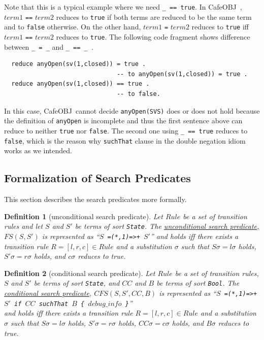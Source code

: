 \documentclass[12pt]{report}
\newtheorem{definition}{Definition}
\newcommand{\stt}[1]{{\small{\tt {#1}}}}
\newcommand{\ul}{\underline}
\newcommand{\cafeobj}{{\sf CafeOBJ}~}
\begin{document}
Note that this is a typical example where we need \stt{\_ == true}. In
\cafeobj, $term1$ {\tt ==} $term2$ reduces to {\tt true} if both terms
are reduced to be the same term and to {\tt false} otherwise. On the
other hand, $term1$ {\tt =} $term2$ reduces to {\tt true} iff $term1$
{\tt ==} $term2$ reduces to {\tt true}. The following code fragment
shows difference between \stt{\_ = \_} and \stt{\_ == \_ }.
\begin{verbatim}
  reduce anyOpen(sv(1,closed)) = true .
                               -- to anyOpen(sv(1,closed)) = true .
  reduce anyOpen(sv(1,closed)) == true . 
                               -- to false.
\end{verbatim}
In this case, \cafeobj cannot decide \stt{anyOpen(SVS)} does or does
not hold because the definition of {\tt anyOpen} is incomplete and
thus the first sentence above can reduce to neither {\tt true} nor
{\tt false}.  The second one using \stt{\_ == true} reduces to
{\tt false}, which is the reason why {\tt suchThat} clause in the
double negation idiom works as we intended.

\subsection{Formalization of Search Predicates}
\label{sec:formalSeach}
This section describes the search predicates more formally.  
\begin{definition}[unconditional search predicate]
  Let $Rule$ be a set of transition rules and let $S$ and $S'$ be
  terms of sort {\tt State}. The \ul{unconditional search predicate,
    $FS(S,S')$} is represented as ``\stt{$S$ =(*,1)=>+ $S'$}''
  and holds iff there exists a transition rule $R=[l,r,c]\in Rule$ and
  a substitution $\sigma$ such that $S\sigma=l\sigma$ holds,
  $S'\sigma=r\sigma$ holds, and $c\sigma$ reduces to true.
\end{definition}
\begin{definition}[conditional search predicate]
  Let $Rule$ be a set of transition rules, $S$ and $S'$ be terms of
  sort {\tt State}, and $CC$ and $B$ be terms of sort {\tt Bool}. The
  \ul{conditional search predicate}, \ul{$CFS(S,S',CC,B)$} is
  represented as ``\stt{$S$ =(*,1)=>+ $S'$ if $CC$ suchThat $B$ \{
    $debug\_info$ \}}''\\ and holds iff there exists a transition
  rule $R=[l,r,c]\in Rule$ and a substitution $\sigma$ such that
  $S\sigma=l\sigma$ holds, $S'\sigma=r\sigma$ holds,
  $CC\sigma=c\sigma$ holds, and $B\sigma$ reduces to true.
\end{definition}
\end{document}
